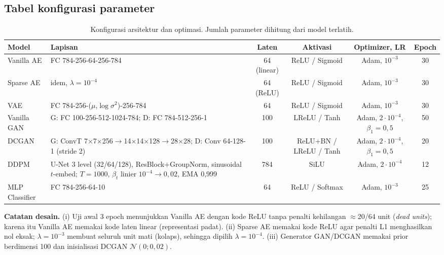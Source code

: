 \subsection{Tabel konfigurasi parameter}
\begin{table}[h]
\centering\small
\caption{Konfigurasi arsitektur dan optimasi. Jumlah parameter dihitung dari model terlatih.}
\label{tab:config}
\begin{tabular}{@{}lp{4.6cm}cccc@{}}
\toprule
Model & Lapisan & Laten & Aktivasi & Optimizer, LR & Epoch \\
\midrule
Vanilla AE & FC 784-256-64-256-784 & 64 (linear) & ReLU / Sigmoid & Adam, $10^{-3}$ & 30 \\
Sparse AE & idem, $\lambda=10^{-4}$ & 64 (ReLU) & ReLU / Sigmoid & Adam, $10^{-3}$ & 30 \\
VAE & FC 784-256-($\mu$,$\log\sigma^2$)-256-784 & 64 & ReLU / Sigmoid & Adam, $10^{-3}$ & 30 \\
Vanilla GAN & G: FC 100-256-512-1024-784; D: FC 784-512-256-1 & 100 & LReLU / Tanh & Adam, $2\!\cdot\!10^{-4}$, $\beta_1\!=\!0{,}5$ & 50 \\
DCGAN & G: ConvT 7$\times$7$\times$256$\to$14$\times$14$\times$128$\to$28$\times$28; D: Conv 64-128-1 (stride 2) & 100 & ReLU+BN / LReLU / Tanh & Adam, $2\!\cdot\!10^{-4}$, $\beta_1\!=\!0{,}5$ & 20 \\
DDPM & U-Net 3 level (32/64/128), ResBlock+GroupNorm, sinusoidal $t$-embed; $T=1000$, $\beta_t$ linier $10^{-4}\!\to\!0{,}02$, EMA 0,999 & 784 & SiLU & Adam, $2\!\cdot\!10^{-4}$ & 12 \\
MLP Classifier & FC 784-256-64-10 & 64 & ReLU / Softmax & Adam, $10^{-3}$ & 25 \\
\bottomrule
\end{tabular}
\end{table}

\noindent\textbf{Catatan desain.} (i) Uji awal 3 epoch menunjukkan Vanilla AE dengan kode ReLU tanpa penalti
kehilangan $\approx$20/64 unit (\emph{dead units}); karena itu Vanilla AE memakai kode laten linear (representasi padat).
(ii) Sparse AE memakai kode ReLU agar penalti L1 menghasilkan nol eksak; $\lambda=10^{-3}$ membuat seluruh unit mati
(kolaps), sehingga dipilih $\lambda=10^{-4}$. (iii) Generator GAN/DCGAN memakai prior berdimensi 100 dan inisialisasi
DCGAN $\mathcal{N}(0;0{,}02)$.

